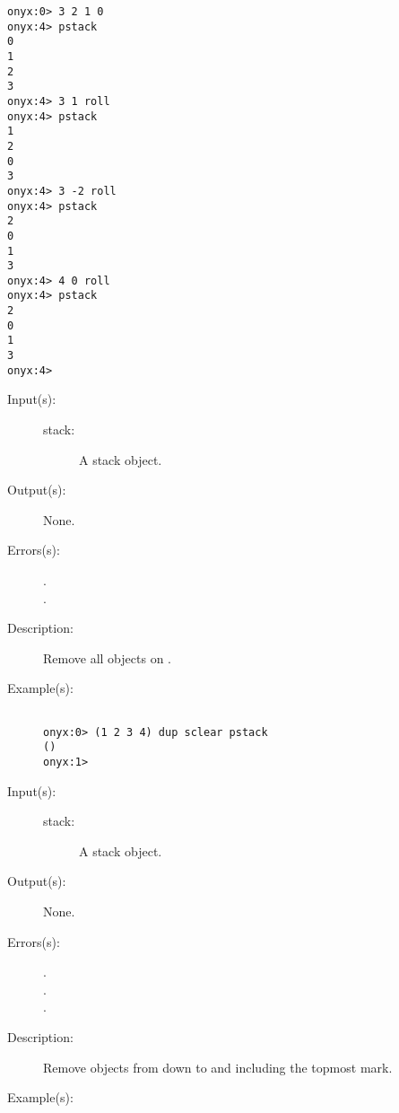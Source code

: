 \begin{description}
\begin{description}
\begin{verbatim}
onyx:0> 3 2 1 0 
onyx:4> pstack
0
1
2
3
onyx:4> 3 1 roll
onyx:4> pstack
1
2
0
3
onyx:4> 3 -2 roll
onyx:4> pstack
2
0
1
3
onyx:4> 4 0 roll
onyx:4> pstack
2
0
1
3
onyx:4>
		\end{verbatim}
	\end{description}
\label{systemdict:sclear}
\item[{\onyxop{stack}{sclear}{--}}: ]
	\begin{description}\item[]
	\item[Input(s): ]
		\begin{description}\item[]
		\item[stack: ]
			A stack object.
		\end{description}
	\item[Output(s): ] None.
	\item[Errors(s): ]
		\begin{description}\item[]
		\item[.]
		\item[.]
		\end{description}
	\item[Description: ]
		Remove all objects on .
	\item[Example(s): ]\begin{verbatim}

onyx:0> (1 2 3 4) dup sclear pstack
()
onyx:1>
		\end{verbatim}
	\end{description}
\label{systemdict:scleartomark}
\item[{\onyxop{stack}{scleartomark}{--}}: ]
	\begin{description}\item[]
	\item[Input(s): ]
		\begin{description}\item[]
		\item[stack: ]
			A stack object.
		\end{description}
	\item[Output(s): ] None.
	\item[Errors(s): ]
		\begin{description}\item[]
		\item[.]
		\item[.]
		\item[.]
		\end{description}
	\item[Description: ]
		Remove objects from  down to and including the
		topmost mark.
	\item[Example(s): ]\begin{verbatim}


\end{verbatim}
\end{description}
\end{description}
